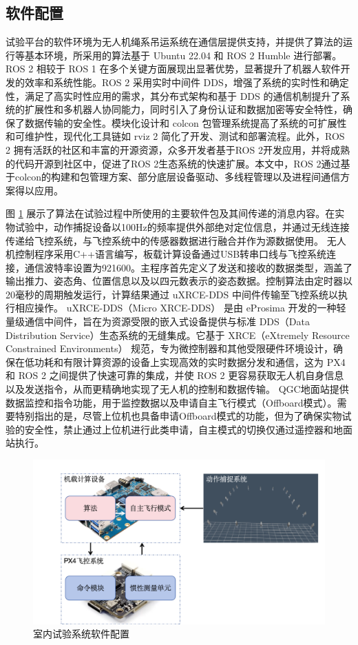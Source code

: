 \documentclass[lang=chs, degree=master, blindreview=false, winfonts=true]{yanputhesis}
\begin{document}
\subsection{软件配置}
试验平台的软件环境为无人机绳系吊运系统在通信层提供支持，并提供了算法的运行等基本环境，所采用的算法基于 Ubuntu 22.04 和 ROS 2 Humble 进行部署。ROS 2 相较于 ROS 1 在多个关键方面展现出显著优势，显著提升了机器人软件开发的效率和系统性能。ROS 2 采用实时中间件 DDS，增强了系统的实时性和确定性，满足了高实时性应用的需求，其分布式架构和基于 DDS 的通信机制提升了系统的扩展性和多机器人协同能力，同时引入了身份认证和数据加密等安全特性，确保了数据传输的安全性。模块化设计和 colcon 包管理系统提高了系统的可扩展性和可维护性，现代化工具链如 rviz 2 简化了开发、测试和部署流程。此外，ROS 2 拥有活跃的社区和丰富的开源资源，众多开发者基于ROS 2开发应用，并将成熟的代码开源到社区中，促进了ROS 2生态系统的快速扩展。本文中，ROS 2通过基于colcon的构建和包管理方案、部分底层设备驱动、多线程管理以及进程间通信方案得以应用。

图 \ref{framewor} 展示了算法在试验过程中所使用的主要软件包及其间传递的消息内容。在实物试验中，动作捕捉设备以100Hz的频率提供外部绝对定位信息，并通过无线连接传递给飞控系统，与飞控系统中的传感器数据进行融合并作为源数据使用。
无人机控制程序采用C++语言编写，板载计算设备通过USB转串口线与飞控系统连接，通信波特率设置为921600。主程序首先定义了发送和接收的数据类型，涵盖了输出推力、姿态角、位置信息以及以四元数表示的姿态数据。控制算法由定时器以20毫秒的周期触发运行，计算结果通过 uXRCE-DDS 中间件传输至飞控系统以执行相应操作。
uXRCE-DDS（Micro XRCE-DDS） 是由 eProsima 开发的一种轻量级通信中间件，旨在为资源受限的嵌入式设备提供与标准 DDS（Data Distribution Service）生态系统的无缝集成。它基于 XRCE（eXtremely Resource Constrained Environments） 规范，专为微控制器和其他受限硬件环境设计，确保在低功耗和有限计算资源的设备上实现高效的实时数据分发和通信，这为 PX4 和 ROS 2 之间提供了快速可靠的集成，并使 ROS 2 更容易获取无人机自身信息以及发送指令，从而更精确地实现了无人机的控制和数据传输。
QGC地面站提供数据监控和指令功能，用于监控数据以及申请自主飞行模式（Offboard模式）。需要特别指出的是，尽管上位机也具备申请Offboard模式的功能，但为了确保实物试验的安全性，禁止通过上位机进行此类申请，自主模式的切换仅通过遥控器和地面站执行。
\begin{figure}[hbt!]
	\centering
	\includegraphics[width=38pc]{picture/5_9.png} 
	\caption{室内试验系统软件配置} 
	\label{framewor}
\end{figure}
\end{document}
